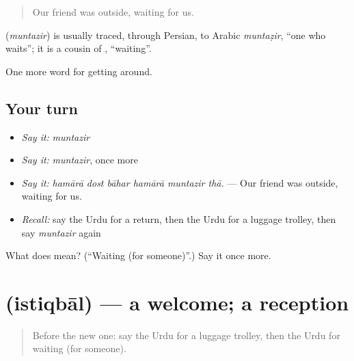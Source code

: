 \begin{quote}
Our friend was outside, waiting for us.
\end{quote}

\begin{cousinweb}
\textbf{} (\emph{muntazir}) is usually traced, through Persian, to Arabic \emph{muntaẓir}, \textquotedblleft{}one who waits\textquotedblright{}; it is a cousin of \textbf{}, \textquotedblleft{}waiting\textquotedblright{}.
\end{cousinweb}

\begin{grammarlens}[title={What you've built}]
One more word for getting around.
\end{grammarlens}

\subsection*{Your turn}
\begin{itemize}
\raggedright
  \item \emph{Say it:} \emph{muntazir}
  \item \emph{Say it:} \emph{muntazir}, once more
  \item \emph{Say it:} \emph{hamārā dost bāhar hamārā muntazir thā.} — Our friend was outside, waiting for us.
  \item \emph{Recall:} say the Urdu for a return, then the Urdu for a luggage trolley, then say \emph{muntazir} again
\end{itemize}

\begin{tcolorbox}[breakable,colback=teal!4,colframe=teal!35!black,title={Before you move on}]
What does  mean? (\textquotedblleft{}Waiting (for someone)\textquotedblright{}.) Say it once more.
\end{tcolorbox}
\section[\texorpdfstring{\ur{استقبال} (istiqbāl)}{استقبال (istiqbāl)}]{ (istiqbāl) — a welcome; a reception}

\label{lesson:UR-C401-istiqbal}



\begin{quote}
Before the new one: say the Urdu for a luggage trolley, then the Urdu for waiting (for someone).
\end{quote}

